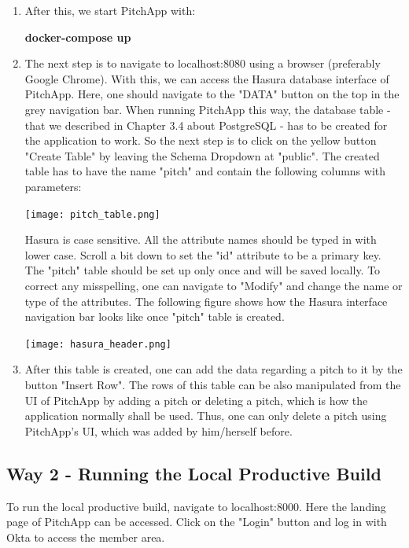 \begin{enumerate}
\item After this, we start PitchApp with:

\textbf{docker-compose up}

\item The next step is to navigate to localhost:8080 using a browser (preferably Google Chrome). With this, we can access the Hasura database interface of PitchApp. Here, one should navigate to the "DATA" button on the top in the grey navigation bar. When running PitchApp this way, the database table - that we described in Chapter 3.4 about PostgreSQL - has to be created for the application to work. So the next step is to click on the yellow button "Create Table" by leaving the Schema Dropdown at "public". The created table has to have the name "pitch" and contain the following columns with parameters:

\begin{center}
	\texttt{[image: pitch\_table.png]}
\end{center}

Hasura is case sensitive. All the attribute names should be typed in with lower case. Scroll a bit down to set the "id" attribute to be a primary key. The "pitch" table should be set up only once and will be saved locally.
To correct any misspelling, one can navigate to "Modify" and change the name or type of the attributes.
The following figure shows how the Hasura interface navigation bar looks like once "pitch" table is created.

\begin{center}
	\texttt{[image: hasura\_header.png]}
\end{center}



\item After this table is created, one can add the data regarding a pitch to it by the button "Insert Row". The rows of this table can be also manipulated from the UI of PitchApp by adding a pitch or deleting a pitch, which is how the application normally shall be used. Thus, one can only delete a pitch using PitchApp's UI, which was added by him/herself before.

\end{enumerate}

\subsection{Way 2 - Running the Local Productive Build}

To run the local productive build, navigate to localhost:8000. Here the landing page of PitchApp can be accessed. Click on the "Login" button and log in with Okta to access the member area.

